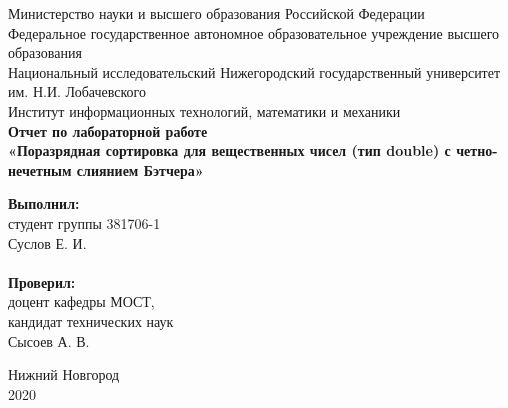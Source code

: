 \documentclass{article}
\begin{document}
\begin{titlepage}

\begin{center}
Министерство науки и высшего образования Российской Федерации \\
\vspace{5mm}
Федеральное государственное автономное образовательное учреждение высшего образования \\
Национальный исследовательский Нижегородский государственный университет им. Н.И. Лобачевского \\
\vspace{1cm}
Институт информационных технологий, математики и механики \\
\vspace{5cm}
\textbf{\large Отчет по лабораторной работе} \\
\vspace{8mm}
\textbf{\Large «Поразрядная сортировка для вещественных чисел (тип double) с четно-нечетным слиянием Бэтчера»} \\
\end{center}

\vspace{1cm}

\newbox{\lbox}
\newlength{\maxl}
\setlength{\maxl}{\wd\lbox}
\hfill\parbox{7cm}{
\hspace*{5cm}\hspace*{-5cm}\textbf{Выполнил:} \\ студент группы 381706-1 \\ Суслов Е. И.\\
\\
\hspace*{5cm}\hspace*{-5cm}\textbf{Проверил:} \\ доцент кафедры МОСТ, \\ кандидат технических наук \\ Сысоев А. В.
}

\vspace{\fill}

\begin{center}
Нижний Новгород \\ 2020
\end{center}
\end{titlepage}

\setcounter{page}{2}

\tableofcontents

\newpage
\end{document}
